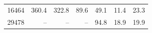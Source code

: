\begin{tabular}{r | r r r | r r r}
         16464  &     \num{360.4}  &     \num{322.8}  &      \num{89.6}  &      \num{49.1}  &      \num{11.4}  &      \num{23.3} \\ 
         29478  &              --  &              --  &              --  &      \num{94.8}  &      \num{18.9}  &      \num{19.9} \\ 
\bottomrule
\end{tabular}
